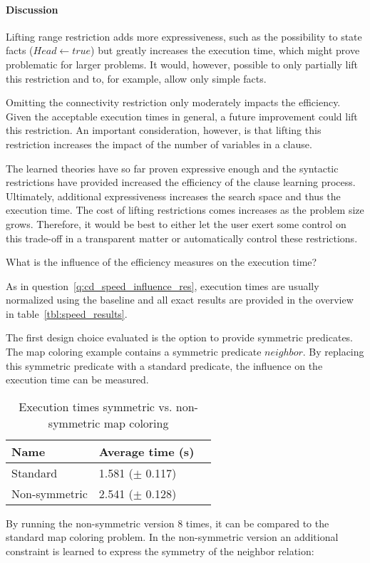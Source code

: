 \paragraph{Discussion}

Lifting range restriction adds more expressiveness, such as the possibility to state facts ($Head \leftarrow true$) but greatly increases the execution time, which might prove problematic for larger problems.
It would, however, possible to only partially lift this restriction and to, for example, allow only simple facts.

Omitting the connectivity restriction only moderately impacts the efficiency.
Given the acceptable execution times in general, a future improvement could lift this restriction.
An important consideration, however, is that lifting this restriction increases the impact of the number of variables in a clause.

The learned theories have so far proven expressive enough and the syntactic restrictions have provided increased the efficiency of the clause learning process.
Ultimately, additional expressiveness increases the search space and thus the execution time.
The cost of lifting restrictions comes increases as the problem size grows.
Therefore, it would be best to either let the user exert some control on this trade-off in a transparent matter or automatically control these restrictions.

\begin{question}
	What is the influence of the efficiency measures on the execution time?
\end{question}

As in question~\ref{q:cd_speed_influence_res}, execution times are usually normalized using the baseline and all exact results are provided in the overview in table~\ref{tbl:speed_results}.

\begin{experiment}
	The first design choice evaluated is the option to provide symmetric predicates.
	The map coloring example contains a symmetric predicate $\mathit{neighbor}$.
	By replacing this symmetric predicate with a standard predicate, the influence on the execution time can be measured.

	\begin{table}[!htp]
		\begin{tabularx}{\textwidth}{XXX}
			\textbf{Name}	& \textbf{Average time (s)}	 \\
			\toprule
			Standard 		& 1.581 ($\pm$ 0.117) \\
			Non-symmetric 	& 2.541 ($\pm$ 0.128) \\
		\end{tabularx}
		\caption{Execution times symmetric vs. non-symmetric map coloring}
		\label{tbl:exp_speed_symm}
	\end{table}

	By running the non-symmetric version $8$ times, it can be compared to the standard map coloring problem.
	In the non-symmetric version an additional constraint is learned to express the symmetry of the neighbor relation: 
\end{experiment}

